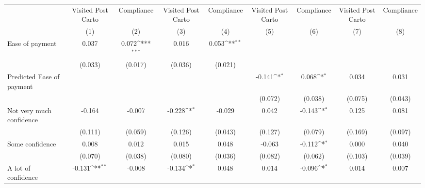{
\def\sym#1{\ifmmode^{#1}\else\(^{#1}\)\fi}
\begin{tabular}{l*{8}{c}}
\hline\hline
                &\multicolumn{1}{c}{Visited Post Carto}&\multicolumn{1}{c}{Compliance}&\multicolumn{1}{c}{Visited Post Carto}&\multicolumn{1}{c}{Compliance}&\multicolumn{1}{c}{Visited Post Carto}&\multicolumn{1}{c}{Compliance}&\multicolumn{1}{c}{Visited Post Carto}&\multicolumn{1}{c}{Compliance}\\
                &\multicolumn{1}{c}{(1)}         &\multicolumn{1}{c}{(2)}         &\multicolumn{1}{c}{(3)}         &\multicolumn{1}{c}{(4)}         &\multicolumn{1}{c}{(5)}         &\multicolumn{1}{c}{(6)}         &\multicolumn{1}{c}{(7)}         &\multicolumn{1}{c}{(8)}         \\
\hline
Ease of payment &    0.037         &    0.072\sym{***}&    0.016         &    0.053\sym{**} &                  &                  &                  &                  \\
                &  (0.033)         &  (0.017)         &  (0.036)         &  (0.021)         &                  &                  &                  &                  \\
Predicted Ease of payment&                  &                  &                  &                  &   -0.141\sym{*}  &    0.068\sym{*}  &    0.034         &    0.031         \\
                &                  &                  &                  &                  &  (0.072)         &  (0.038)         &  (0.075)         &  (0.043)         \\
Not very much confidence&   -0.164         &   -0.007         &   -0.228\sym{*}  &   -0.029         &    0.042         &   -0.143\sym{*}  &    0.125         &    0.081         \\
                &  (0.111)         &  (0.059)         &  (0.126)         &  (0.043)         &  (0.127)         &  (0.079)         &  (0.169)         &  (0.097)         \\
Some confidence &    0.008         &    0.012         &    0.015         &    0.048         &   -0.063         &   -0.112\sym{*}  &    0.000         &    0.040         \\
                &  (0.070)         &  (0.038)         &  (0.080)         &  (0.036)         &  (0.082)         &  (0.062)         &  (0.103)         &  (0.039)         \\
A lot of confidence&   -0.131\sym{**} &   -0.008         &   -0.134\sym{*}  &    0.048         &    0.014         &   -0.096\sym{*}  &    0.014         &    0.007         \\

\end{tabular}}
